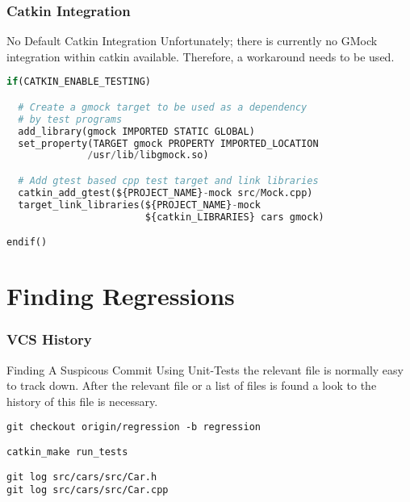 \documentclass{beamer}
\begin{document}
\begin{frame}[fragile]
  \frametitle{Catkin Integration}
  \begin{block}{No Default Catkin Integration}
    Unfortunately; there is currently no GMock integration within catkin available. Therefore, a workaround needs to be used.
  \end{block}

  \begin{lstlisting}[title=GMock Catkin Integration Workaround, style=code, language=python, basicstyle=\ttfamily\footnotesize\color{white}]
if(CATKIN_ENABLE_TESTING)

  # Create a gmock target to be used as a dependency
  # by test programs
  add_library(gmock IMPORTED STATIC GLOBAL)
  set_property(TARGET gmock PROPERTY IMPORTED_LOCATION
              /usr/lib/libgmock.so)

  # Add gtest based cpp test target and link libraries
  catkin_add_gtest(${PROJECT_NAME}-mock src/Mock.cpp)
  target_link_libraries(${PROJECT_NAME}-mock 
                        ${catkin_LIBRARIES} cars gmock)

endif()
  \end{lstlisting}
\end{frame}

\section{Finding Regressions}
\begin{frame}[fragile]
  \frametitle{VCS History}
  \begin{block}{Finding A Suspicous Commit}
    Using Unit-Tests the relevant file is normally easy to track down. After the relevant file or a list of files is found a look to the history of this file is necessary.
  \end{block}

  \begin{lstlisting}[title=Getting the broken code, style=cmd]
git checkout origin/regression -b regression
  \end{lstlisting}

  \begin{lstlisting}[title=Run the tests, style=cmd]
catkin_make run_tests
  \end{lstlisting}

  \pause
  \begin{lstlisting}[title=Have a look at the log, style=cmd]
git log src/cars/src/Car.h
git log src/cars/src/Car.cpp
  \end{lstlisting}
\end{frame}
\end{document}
